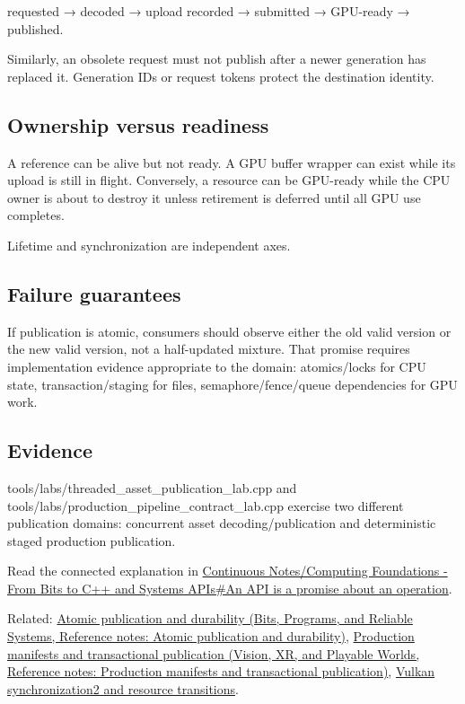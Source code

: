 requested → decoded → upload recorded → submitted → GPU-ready → published.

Similarly, an obsolete request must not publish after a newer generation has replaced it. Generation IDs or request tokens protect the destination identity.

\subsection{Ownership versus readiness}\label{appendix-fdae7ff0a23f-ownership-versus-readiness}

\hypertarget{appendix-fdae7ff0a23f-ownership-versus-readiness}{}

A reference can be alive but not ready. A GPU buffer wrapper can exist while its upload is still in flight. Conversely, a resource can be GPU-ready while the CPU owner is about to destroy it unless retirement is deferred until all GPU use completes.

Lifetime and synchronization are independent axes.

\subsection{Failure guarantees}\label{appendix-fdae7ff0a23f-failure-guarantees}

\hypertarget{appendix-fdae7ff0a23f-failure-guarantees}{}

If publication is atomic, consumers should observe either the old valid version or the new valid version, not a half-updated mixture. That promise requires implementation evidence appropriate to the domain: atomics/locks for CPU state, transaction/staging for files, semaphore/fence/queue dependencies for GPU work.

\subsection{Evidence}\label{appendix-fdae7ff0a23f-evidence}

\hypertarget{appendix-fdae7ff0a23f-evidence}{}

tools/labs/threaded\_asset\_publication\_lab.cpp and tools/labs/production\_pipeline\_contract\_lab.cpp exercise two different publication domains: concurrent asset decoding/publication and deterministic staged production publication.

Read the connected explanation in \hyperref[01-foundations-i-ch008-an-api-is-a-promise-about-an-operation]{Continuous Notes/Computing Foundations - From Bits to C++ and Systems APIs\#An API is a promise about an operation}.

Related: \href{../01-Bits-Programs-and-Reliable-Systems/main.pdf\#nameddest=appendix-e89a8f290ef5}{Atomic publication and durability (Bits, Programs, and Reliable Systems, Reference notes: Atomic publication and durability)}, \href{../07-Vision-XR-and-Playable-Worlds/main.pdf\#nameddest=appendix-91eaa3cbdbc3}{Production manifests and transactional publication (Vision, XR, and Playable Worlds, Reference notes: Production manifests and transactional publication)}, \hyperref[appendix-f15ce0d9c170]{Vulkan synchronization2 and resource transitions}.
